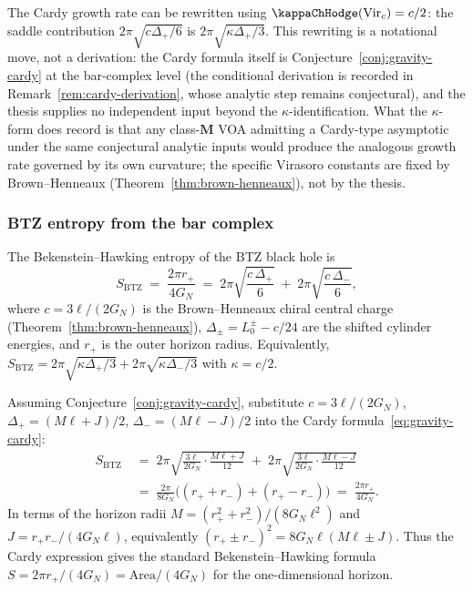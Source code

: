\begin{remark}
\label{rem:cardy-thesis}
The Cardy growth rate can be rewritten using
$\kappaChHodge(\mathrm{Vir}_c) = c/2$: the saddle contribution
$2\pi\sqrt{c\Delta_+/6}$ is
$2\pi\sqrt{\kappa\Delta_+/3}$. This rewriting is a notational
move, not a derivation: the Cardy formula itself is
Conjecture~\ref{conj:gravity-cardy} at the bar-complex level
(the conditional derivation is recorded in
Remark~\ref{rem:cardy-derivation}, whose analytic step
remains conjectural), and the thesis supplies no independent
input beyond the $\kappa$-identification. What the
$\kappa$-form does record is that any class-$\mathbf{M}$ VOA
admitting a Cardy-type asymptotic under the same conjectural
analytic inputs would produce the analogous growth rate
governed by its own curvature; the specific Virasoro
constants are fixed by Brown--Henneaux
(Theorem~\ref{thm:brown-henneaux}), not by the thesis.
\end{remark}

\subsubsection*{BTZ entropy from the bar complex}

\begin{conjecture}
\label{conj:gravity-btz-entropy}
The Bekenstein--Hawking entropy of the BTZ black hole is
\begin{equation}\label{eq:gravity-btz-entropy}
\boxed{
S_{\mathrm{BTZ}}
\;=\;
\frac{2\pi r_+}{4G_N}
\;=\;
2\pi\sqrt{\frac{c\,\Delta_+}{6}}
\;+\;
2\pi\sqrt{\frac{c\,\Delta_-}{6}},
}
\end{equation}
where $c = 3\ell/(2G_N)$ is the Brown--Henneaux chiral central charge
\textup{(}Theorem~\textup{\ref{thm:brown-henneaux})},
$\Delta_\pm=L_0^\pm-c/24$ are the shifted cylinder energies,
and $r_+$ is the outer horizon radius.
Equivalently, $S_{\mathrm{BTZ}} =
2\pi\sqrt{\kappa\Delta_+/3}
+ 2\pi\sqrt{\kappa\Delta_-/3}$ with $\kappa = c/2$.
\end{conjecture}

\begin{remark}
\label{rem:btz-derivation}
Assuming Conjecture~\ref{conj:gravity-cardy}, substitute
$c = 3\ell/(2G_N)$,
$\Delta_+ = (M\ell+J)/2$,
$\Delta_- = (M\ell-J)/2$ into the Cardy
formula~\eqref{eq:gravity-cardy}:
\begin{align*}
S_{\mathrm{BTZ}}
&\;=\;
2\pi\sqrt{\frac{3\ell}{2G_N}\cdot\frac{M\ell+J}{12}}
\;+\;
2\pi\sqrt{\frac{3\ell}{2G_N}\cdot\frac{M\ell-J}{12}}
\\[4pt]
&\;=\;
\frac{2\pi}{8G_N}\bigl((r_+ + r_-) + (r_+ - r_-)\bigr)
\;=\;
\frac{2\pi r_+}{4G_N}.
\end{align*}
In terms of the horizon radii
$M=(r_+^2+r_-^2)/(8G_N\ell^2)$ and
$J=r_+r_-/(4G_N\ell)$, equivalently
$(r_+\pm r_-)^2=8G_N\ell(M\ell\pm J)$.
Thus the Cardy expression gives the standard
Bekenstein--Hawking formula
$S = 2\pi r_+/(4G_N) = \mathrm{Area}/(4G_N)$ for the
one-dimensional horizon.
\end{remark}

